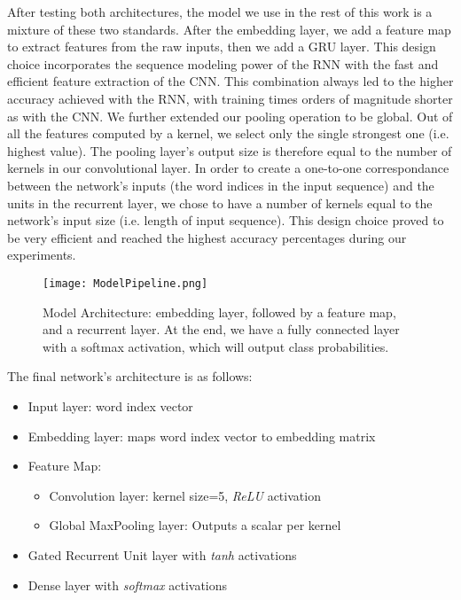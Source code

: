 After testing both architectures, the model we use in the rest of this work is a mixture of these two standards.
After the embedding layer, we add a feature map to extract features from the raw inputs,
then we add a GRU layer. This design choice incorporates the sequence modeling power of the RNN with the fast and efficient feature extraction of the CNN.
This combination always led to the higher accuracy achieved with the RNN, with training times orders of magnitude shorter as with the CNN.
We further extended our pooling operation to be global. Out of all the features computed by a kernel, we select only the single strongest one
(i.e. highest value). The pooling layer's output size is therefore equal to the number of kernels in our convolutional layer. In order to create
a one-to-one correspondance between the network's inputs (the word indices in the input sequence) and the units in the recurrent layer, we chose to have
a number of kernels equal to the network's input size (i.e. length of input sequence).
This design choice proved to be very efficient and reached the highest accuracy percentages during our experiments.

\begin{figure}[H]
\caption{Model Architecture: embedding layer, followed by a feature map, and a recurrent layer. At the end, we have
a fully connected layer with a softmax activation, which will output class probabilities.}
\centering
\texttt{[image: ModelPipeline.png]}
\end{figure}

The final network's architecture is as follows:
\begin{itemize}
  \item Input layer: word index vector
  \item Embedding layer: maps word index vector to embedding matrix
  \item Feature Map:
      \begin{itemize}
        \item Convolution layer: kernel size=5, \textit{ReLU} activation
        \item Global MaxPooling layer: Outputs a scalar per kernel
      \end{itemize}
\item Gated Recurrent Unit layer with \textit{tanh} activations
\item Dense layer with \textit{softmax} activations
\end{itemize}
